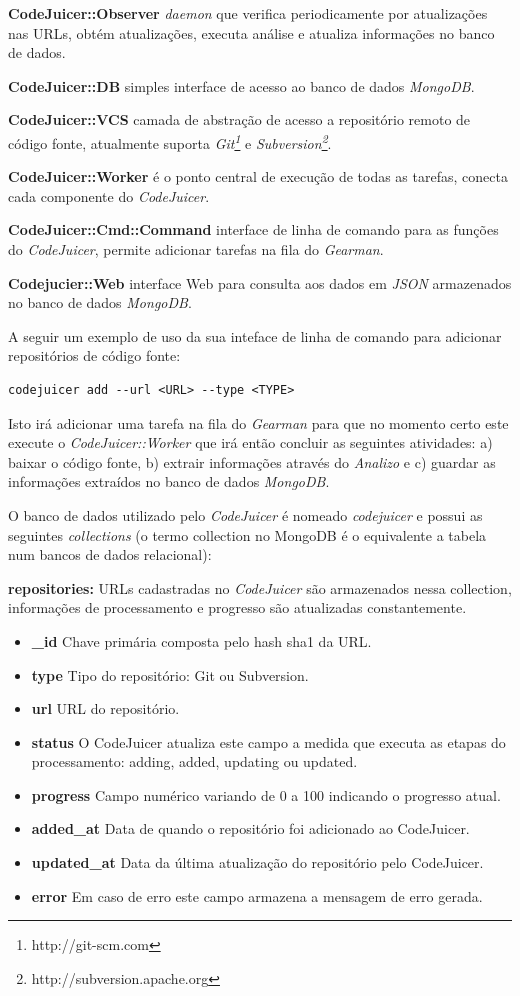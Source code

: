 \documentclass[conference]{IEEEtran}
\begin{document}
{\bf CodeJuicer::Observer} {\it daemon} que verifica periodicamente por
atualizações nas URLs, obtém atualizações, executa análise e atualiza
informações no banco de dados.

{\bf CodeJuicer::DB} simples interface de acesso ao banco de dados
{\it MongoDB}.

{\bf CodeJuicer::VCS} camada de abstração de acesso a repositório remoto de
código fonte, atualmente suporta {\it Git\footnote{http://git-scm.com}} e {\it
Subversion\footnote{http://subversion.apache.org}}.

{\bf CodeJuicer::Worker} é o ponto central de execução de todas as tarefas,
conecta cada componente do {\it CodeJuicer}.

{\bf CodeJuicer::Cmd::Command} interface de linha de comando para as funções
do {\it CodeJuicer}, permite adicionar tarefas na fila do {\it Gearman}.

{\bf Codejucier::Web} interface Web para consulta aos dados em {\it JSON}
armazenados no banco de dados {\it MongoDB}.

A seguir um exemplo de uso da sua inteface de linha de comando para adicionar
repositórios de código fonte:

\begin{verbatim}
codejuicer add --url <URL> --type <TYPE>
\end{verbatim}

Isto irá adicionar uma tarefa na fila do {\it Gearman} para que no momento
certo este execute o {\it CodeJuicer::Worker} que irá então concluir as
seguintes atividades: a) baixar o código fonte, b) extrair informações através
do {\it Analizo} e c) guardar as informações extraídos no banco de dados {\it
MongoDB}.

O banco de dados utilizado pelo {\it CodeJuicer} é nomeado {\it codejuicer} e
possui as seguintes {\it collections} (o termo collection no MongoDB é o
equivalente a tabela num bancos de dados relacional):

{\bf repositories:} URLs cadastradas no {\it CodeJuicer} são armazenados nessa
collection, informações de processamento e progresso são atualizadas
constantemente.

\begin{itemize}
  \item {{\bf \_id} Chave primária composta pelo hash sha1 da URL.}
  \item {{\bf type} Tipo do repositório: Git ou Subversion.}
  \item {{\bf url} URL do repositório.}
  \item {{\bf status} O CodeJuicer atualiza este campo a medida que executa as etapas do processamento: adding, added, updating ou updated.}
  \item {{\bf progress} Campo numérico variando de 0 a 100 indicando o progresso atual.}
  \item {{\bf added\_at} Data de quando o repositório foi adicionado ao CodeJuicer.}
  \item {{\bf updated\_at} Data da última atualização do repositório pelo CodeJuicer.}
  \item {{\bf error} Em caso de erro este campo armazena a mensagem de erro gerada.}
\end{itemize}
\end{document}
